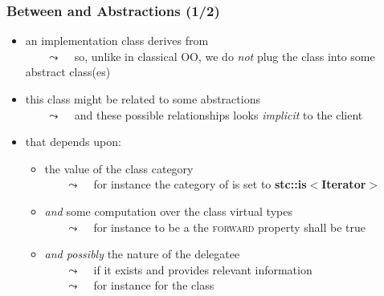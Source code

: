 \begin{frame}
  \frametitle{Between \bftop and Abstractions (1/2)}


\begin{itemize}
\item an implementation class derives from \bftop\\
  ~~~ {\tiny $\leadsto$ ~ so, unlike in classical OO, we do \textit{not} plug the class into some abstract class(es)}
  \medskip
\item this class might be related to some abstractions\\
  ~~~ {\tiny $\leadsto$ ~ and these possible relationships looks \textit{implicit} to the client}
  \medskip
\item that depends upon:
    \smallskip
  \begin{itemize}
    \scriptsize
  \item the value of the class category\\
    ~~~ {\tiny $\leadsto$ ~ for instance the category of \bfarrayiteratorT is set to \textbf{stc::is$<$Iterator$>$}}
    \smallskip
  \item \textit{and} some computation over the class virtual types\\
    ~~~ {\tiny $\leadsto$ ~ for instance to be a \bfForwardIterator the \textsc{forward} property shall be true}
    \smallskip
  \item \textit{and possibly} the nature of the delegatee\\
    ~~~ {\tiny $\leadsto$ ~ if it exists and provides relevant information}\\
    ~~~ {\tiny $\leadsto$ ~ for instance \bfT for the class \bfreverseT}
  \end{itemize}
\end{itemize}

\end{frame}



